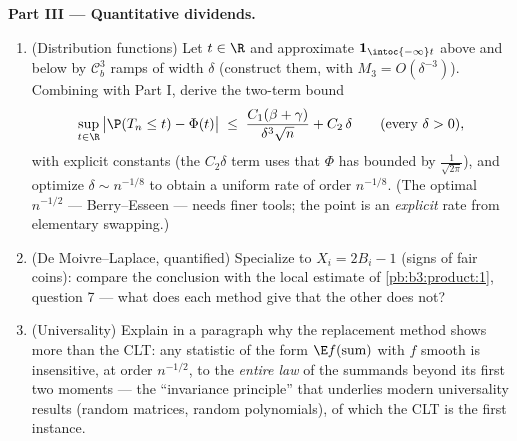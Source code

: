 \begin{problem}
\medskip
\noindent\textbf{Part III --- Quantitative dividends.}
\begin{enumerate}[resume]
  \item (Distribution functions) Let $t \in \R$ and
        approximate $\mathbf 1_{\intoc{-\infty}t}$ above and
        below by $\mathcal C^3_b$ ramps of width $\delta$
        (construct them, with $M_3 = O(\delta^{-3})$).
        Combining with Part I, derive the two-term bound
        \[
        \sup_{t\in\R}\,\bigl|\P(T_n \leq t) -
        \Phi(t)\bigr| \;\leq\;
        \frac{C_1(\beta + \gamma)}{\delta^3\sqrt n} +
        C_2\,\delta
        \qquad (\text{every } \delta > 0),
        \]
        with explicit constants (the $C_2\delta$ term uses
        that $\Phi$ has  bounded by
        $\frac1{\sqrt{2\pi}}$), and optimize $\delta \sim
        n^{-1/8}$ to obtain a uniform rate of order
        $n^{-1/8}$.
        (The optimal $n^{-1/2}$ --- Berry--Esseen ---
        needs finer tools; the point is an \emph{explicit}
        rate from elementary swapping.)
  \item (De Moivre--Laplace, quantified) Specialize to
        $X_i = 2B_i - 1$ (signs of fair coins): compare the
        conclusion with the local estimate of
        \cref{pb:b3:product:1}, question 7 --- what does
        each method give that the other does not?
  \item (Universality) Explain in a paragraph why the
        replacement method shows more than the CLT: any
        statistic of the form $\E f(\text{sum})$ with $f$
        smooth is insensitive, at order $n^{-1/2}$, to the
        \emph{entire law} of the summands beyond its first
        two moments --- the ``invariance principle'' that
        underlies modern universality results (random
        matrices, random polynomials), of which the CLT is
        the first instance.
\end{enumerate}


\end{problem}
